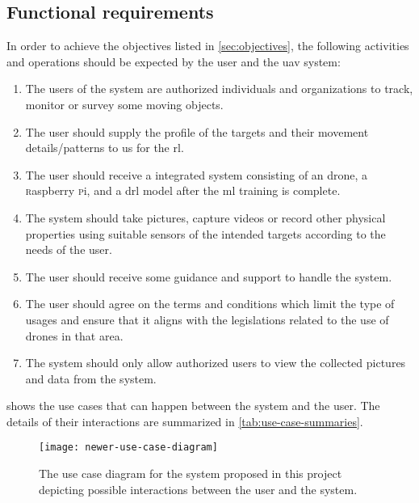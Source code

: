 \documentclass[../main.tex]{subfiles}
\begin{document}
\subsection{Functional requirements}

In order to achieve the objectives listed
in \cref{sec:objectives}, the following activities 
and operations should be expected by the user 
and the \gls{uav} system:

\begin{enumerate}
    \item The users of the system are authorized
        individuals and organizations to track, monitor or survey
        some moving objects.
    \item The user should supply the 
        profile of the targets 
        and their movement details/patterns
        to us for the \gls{rl}.
    \item The user should receive 
        a \uav integrated system consisting of 
        an \anafi drone, a \textsc{r}aspberry \textsc{p}i,
        and a \gls{drl} model after the \gls{ml} training
        is complete.
    \item The system should take pictures, capture videos
        or record other physical properties using
        suitable sensors of the intended
        targets according to the needs
        of the user.
    \item The user should receive some 
        guidance and support 
        to handle the system.
    \item The user should agree on 
        the terms and conditions 
        which limit the type of usages and 
        ensure that it aligns with the legislations
        related to the use of drones in that area.
    \item The system should only allow 
        authorized users 
        to view the collected pictures and 
        data from the \anafi system.
\end{enumerate}

 shows the use cases that can
happen between the system and the user. The details of their
interactions are summarized in \cref{tab:use-case-summaries}.

\begin{figure}[tbp] 
    \centering
    \texttt{[image: newer-use-case-diagram]} 
    \caption{The use case diagram for the system proposed 
            in this project depicting possible interactions 
            between the user and the system.}
    \label{fig:use-case-diagram} 
\end{figure}
\end{document}
